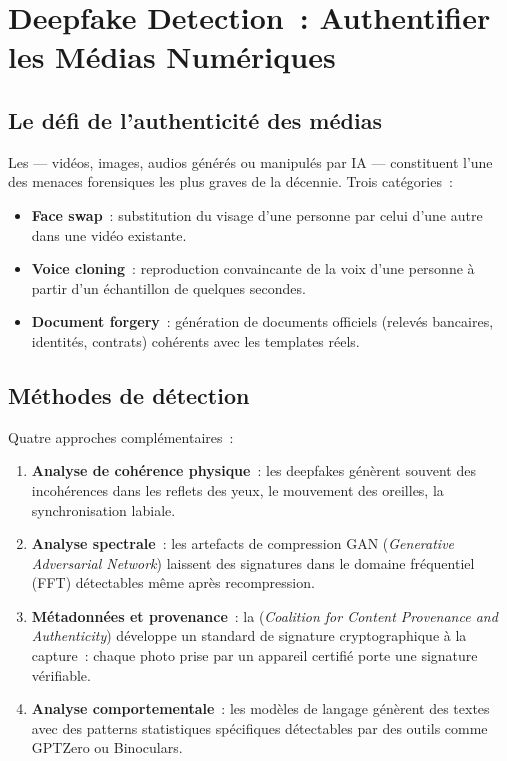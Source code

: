 \section{Deepfake Detection~: Authentifier les Médias Numériques}
\label{sec:deepfakes}

\subsection{Le défi de l'authenticité des médias}

Les  --- vidéos, images, audios générés
ou manipulés par IA --- constituent l'une des menaces forensiques les plus
graves de la décennie. Trois catégories~:
\begin{itemize}
    \item \textbf{Face swap}~: substitution du visage d'une personne par
          celui d'une autre dans une vidéo existante.
    \item \textbf{Voice cloning}~: reproduction convaincante de la voix
          d'une personne à partir d'un échantillon de quelques secondes.
    \item \textbf{Document forgery}~: génération de documents officiels
          (relevés bancaires, identités, contrats) cohérents avec les
          templates réels.
\end{itemize}

\subsection{Méthodes de détection}

Quatre approches complémentaires~:
\begin{enumerate}
    \item \textbf{Analyse de cohérence physique}~: les deepfakes génèrent
          souvent des incohérences dans les reflets des yeux, le
          mouvement des oreilles, la synchronisation labiale.
    \item \textbf{Analyse spectrale}~: les artefacts de compression GAN
          (\textit{Generative Adversarial Network}) laissent des
          signatures dans le domaine fréquentiel (FFT) détectables
          même après recompression.
    \item \textbf{Métadonnées et provenance}~: la
           (\textit{Coalition for Content
          Provenance and Authenticity}) développe un standard de
          signature cryptographique à la capture~: chaque photo prise
          par un appareil certifié porte une signature vérifiable.
    \item \textbf{Analyse comportementale}~: les modèles de langage
          génèrent des textes avec des patterns statistiques spécifiques
          détectables par des outils comme GPTZero ou Binoculars.
\end{enumerate}

